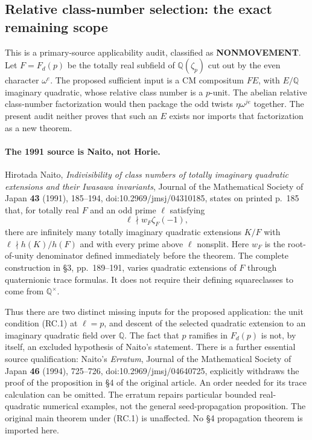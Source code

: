 \subsection{Relative class-number selection: the exact remaining scope}
\label{KT-RELATIVE-CLASS-SELECTION-SCOPE}

This is a primary-source applicability audit, classified as
\textbf{NONMOVEMENT}.  Let $F=F_d(p)$ be the totally real subfield of
$\mathbb Q(\zeta_p)$ cut out by the even character $\omega^e$.
The proposed sufficient input is a CM compositum $FE$, with $E/\mathbb Q$
imaginary quadratic, whose relative class number is a $p$-unit.
The abelian relative class-number factorization would then package the
odd twists $\eta\omega^{je}$ together.  The present audit neither proves
that such an $E$ exists nor imports that factorization as a new theorem.

\paragraph{The 1991 source is Naito, not Horie.}
Hirotada Naito, \emph{Indivisibility of class numbers of totally imaginary
quadratic extensions and their Iwasawa invariants}, Journal of the
Mathematical Society of Japan \textbf{43} (1991), 185--194,
doi:10.2969/jmsj/04310185, states on printed p.~185 that, for totally real
$F$ and an odd prime $\ell$ satisfying
\[
             \ell\nmid w_F\zeta_F(-1),                 \tag{RC.1}
\]
there are infinitely many totally imaginary quadratic extensions $K/F$
with $\ell\nmid h(K)/h(F)$ and with every prime above $\ell$ nonsplit.
Here $w_F$ is the root-of-unity denominator defined immediately before
the theorem.  The complete construction in \S3, pp.~189--191, varies
quadratic extensions of $F$ through quaternionic trace formulas.  It
does not require their defining squareclasses to come from
$\mathbb Q^\times$.

Thus there are two distinct missing inputs for the proposed application:
the unit condition (RC.1) at $\ell=p$, and descent of the selected
quadratic extension to an imaginary quadratic field over $\mathbb Q$.
The fact that $p$ ramifies in $F_d(p)$ is not, by itself, an excluded
hypothesis of Naito's statement.  There is a further essential source
qualification: Naito's \emph{Erratum}, Journal of the Mathematical
Society of Japan \textbf{46} (1994), 725--726,
doi:10.2969/jmsj/04640725, explicitly withdraws the proof of the
proposition in \S4 of the original article.  An order needed for its
trace calculation can be omitted.  The erratum repairs particular
bounded real-quadratic numerical examples, not the general
seed-propagation proposition.  The original main theorem under
(RC.1) is unaffected.  No \S4 propagation theorem is imported here.

